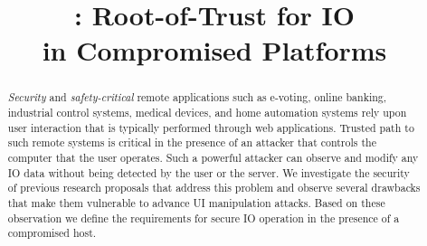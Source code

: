 \newif\ifccs
\ccsfalse

\ifccs

\else

\fi



\newif\ifdesperatetime

\graphicspath{{images/}}


\title{\name: Root-of-Trust for IO \\ in Compromised Platforms}

\ifccs
\else
\maketitle
\fi

\thispagestyle{plain}
\pagestyle{plain}

\begin{abstract}
 

\emph{Security} and \emph{safety-critical} remote applications such as e-voting, online banking, industrial control systems, medical devices, and home automation systems rely upon user interaction that is typically performed through web applications. Trusted path to such remote systems is critical in the presence of an attacker that controls the computer that the user operates. Such a powerful attacker can observe and modify any IO data without being detected by the user or the server. 
We investigate the security of previous research proposals that address this problem and observe several drawbacks that make them vulnerable to advance UI manipulation attacks.
Based on these observation we define the requirements for secure IO operation in the presence of a compromised host.


\end{abstract}
